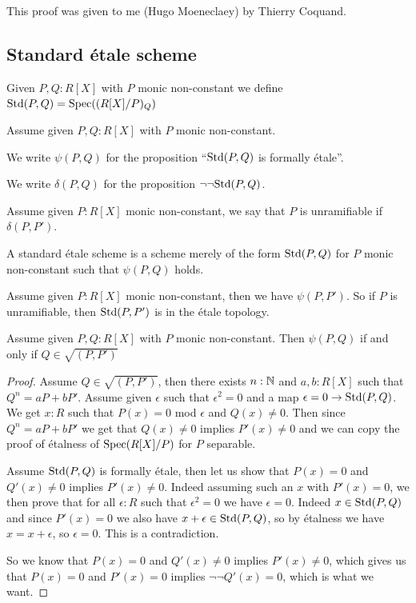 This proof was given to me (Hugo Moeneclaey) by Thierry Coquand.

\subsection{Standard \'etale scheme}

\begin{definition}
Given $P,Q:R[X]$ with $P$ monic non-constant we define $\mathrm{Std}(P,Q) = \operatorname{Spec}((R[X]/P)_Q)$
\end{definition}

\begin{definition}
Assume given $P,Q:R[X]$ with $P$ monic non-constant.

We write $\psi(P,Q)$ for the proposition ``$\mathrm{Std}(P,Q)$ is formally \'etale''.

We write $\delta(P,Q)$ for the proposition $\neg\neg\mathrm{Std}(P,Q)$.
\end{definition}

\begin{definition}
Assume given $P:R[X]$ monic non-constant, we say that $P$ is unramifiable if $\delta(P,P')$.
\end{definition}

\begin{definition}
A standard \'etale scheme is a scheme merely of the form $\mathrm{Std}(P,Q)$ for $P$ monic non-constant such that $\psi(P,Q)$ holds.
\end{definition}

\begin{remark}\label{remark-unramifiable-polynomial}
Assume given $P:R[X]$ monic non-constant, then we have $\psi(P,P')$. So if $P$ is unramifiable, then $\mathrm{Std}(P,P')$ is in the \'etale topology.
\end{remark}

\begin{lemma}\label{standard-etale-characterisation}
Assume given $P,Q:R[X]$ with $P$ monic non-constant. Then $\psi(P,Q)$ if and only if $Q\in\sqrt{(P,P')}$
\end{lemma}

\begin{proof}
Assume $Q\in \sqrt{(P,P')}$, then there exists $n:\mathbb{N}$ and $a,b:R[X]$ such that $Q^n = aP + bP'$. Assume given $\epsilon$ such that $\epsilon^2=0$ and a map $\epsilon=0\to \mathrm{Std}(P,Q)$. We get $x:R$ such that $P(x) = 0$ mod $\epsilon$ and $Q(x)\not=0$. Then since $Q^n = aP + bP'$ we get that $Q(x)\not=0$ implies $P'(x)\not=0$ and we can copy the proof of \'etalness of $\operatorname{Spec}(R[X]/P)$ for $P$ separable. 

Assume $\mathrm{Std}(P,Q)$ is formally \'etale, then let us show that $P(x)=0$ and $Q'(x)\not=0$ implies $P'(x)\not=0$. Indeed assuming such an $x$ with $P'(x)=0$, we then prove that for all $\epsilon:R$ such that $\epsilon^2=0$ we have $\epsilon=0$. Indeed $x\in\mathrm{Std}(P,Q)$ and since $P'(x)=0$ we also have $x+\epsilon\in \mathrm{Std}(P,Q)$, so by \'etalness we have $x=x+\epsilon$, so $\epsilon=0$. This is a contradiction.

So we know that $P(x)=0$ and $Q'(x)\not=0$ implies $P'(x)\not=0$, which gives us that $P(x)=0$ and $P'(x)=0$ implies $\neg\neg Q'(x)=0$, which is what we want.
\end{proof}

